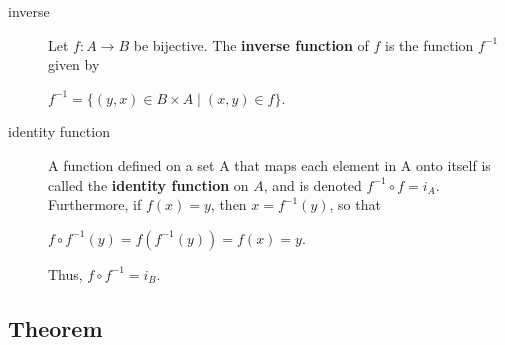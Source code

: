 \documentclass[12pt]{article}
\begin{document}
\begin{description}
\item[{inverse}] Let \(f:A\longrightarrow{}B\) be bijective. The \textbf{inverse function} of
\(f\) is the function \(f^{-1}\) given by
\begin{center}
\(f^{-1}=\{(y,x)\in{}B\times{}A\mid(x,y)\in{}f\}\).
\end{center}
\item[{identity function}] A function defined on a set A that maps each element in A
onto itself is called the \textbf{identity function} on \(A\), and is denoted
\(f^{-1}\circ{}f=i_{A}\). Furthermore, if \(f(x)=y\), then \(x=f^{-1}(y)\), so that
\begin{center}
\(f\circ{}f^{-1}(y)=f(f^{-1}(y))=f(x)=y\).
\end{center}
Thus, \(f\circ{}f^{-1}=i_{B}\).
\end{description}
\subsection{Theorem}
\label{sec:org289bae6}
\end{document}

